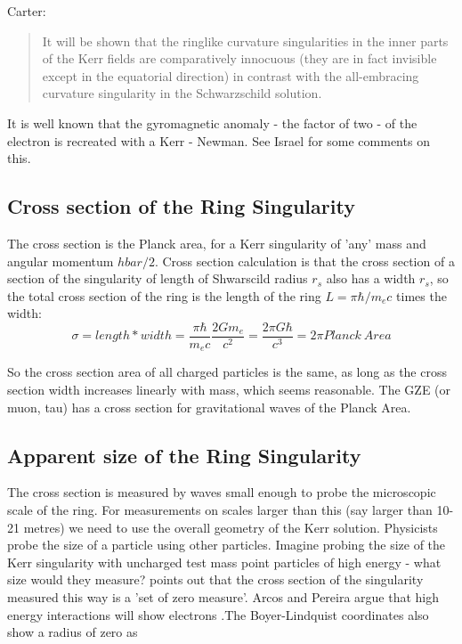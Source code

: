 \documentclass[../rzero]{subfiles}
\begin{document}
Carter:\cite{Carter1968}
\begin{quotation}
It will be shown that the ringlike curvature singularities in the inner parts of the Kerr fields are comparatively innocuous (they are in fact invisible except in the equatorial direction) in contrast with the all-embracing curvature singularity in the Schwarzschild solution.
\end{quotation}

It is well known that the gyromagnetic anomaly - the factor of two - of the electron is recreated with a Kerr - Newman. See Israel \cite{Israel1970} for some comments on this. 

\subsection{Cross section of the Ring Singularity}
The cross section is the Planck area, for a Kerr singularity of 'any' mass and angular momentum $hbar/2$. 
Cross section calculation is that the cross section of a section of the singularity of length of Shwarscild radius $r_s$ also has a width $r_s$, so the total cross section of the ring is the length of the ring $L = \pi \hbar/m_e c$ times the width:
\begin{equation}
  \sigma = length*width = \frac{\pi \hbar}{m_e c} \frac{2Gm_e}{c^2} = \frac{2\pi G \hbar}{c^3} = 2\pi Planck\ Area
\end{equation}

So the cross section area of all charged particles is the same, as long as the cross section width increases linearly with mass, which seems reasonable. 
The GZE (or muon, tau) has a cross section for gravitational waves of the Planck Area. 

\subsection{Apparent size of the Ring Singularity}
The cross section is measured by waves small enough to probe the microscopic scale of the ring. For measurements on scales larger than this (say larger than 10-21 metres) we need to use the overall geometry of the Kerr solution.  Physicists probe the size of a particle using other particles. Imagine probing the size of the Kerr singularity with uncharged test mass point particles of high energy - what size would they measure? \cite{Carter1968} points out that the cross section of the singularity measured this way is a 'set of zero measure'. Arcos and Pereira argue that high energy interactions will show electrons\cite{Arcos2004a} \cite{Arcos2007}.The Boyer-Lindquist coordinates also show a radius of zero as 
\end{document}
